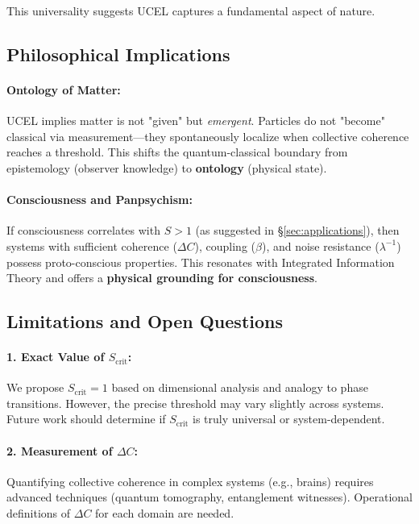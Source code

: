 \documentclass[12pt,a4paper]{article}
\begin{document}
This universality suggests UCEL captures a fundamental aspect of nature.

\subsection{Philosophical Implications}

\paragraph{Ontology of Matter:}
UCEL implies matter is not "given" but \emph{emergent}. Particles do not "become" classical via measurement---they spontaneously localize when collective coherence reaches a threshold. This shifts the quantum-classical boundary from epistemology (observer knowledge) to \textbf{ontology} (physical state).

\paragraph{Consciousness and Panpsychism:}
If consciousness correlates with $S > 1$ (as suggested in \S\ref{sec:applications}), then systems with sufficient coherence ($\Delta C$), coupling ($\beta$), and noise resistance ($\lambda^{-1}$) possess proto-conscious properties. This resonates with Integrated Information Theory \citep{tononi2008} and offers a \textbf{physical grounding for consciousness}.

\subsection{Limitations and Open Questions}

\paragraph{1. Exact Value of $S_{\text{crit}}$:}
We propose $S_{\text{crit}} = 1$ based on dimensional analysis and analogy to phase transitions. However, the precise threshold may vary slightly across systems. Future work should determine if $S_{\text{crit}}$ is truly universal or system-dependent.

\paragraph{2. Measurement of $\Delta C$:}
Quantifying collective coherence in complex systems (e.g., brains) requires advanced techniques (quantum tomography, entanglement witnesses). Operational definitions of $\Delta C$ for each domain are needed.
\end{document}
